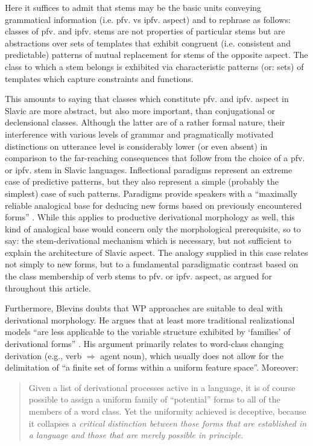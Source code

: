 \documentclass[output=paper]{langscibook}
\begin{document}
Here it suffices to admit that stems may be the basic units conveying grammatical information (i.e. pfv. vs ipfv. aspect) and to rephrase as follows: classes of pfv. and ipfv. stems are not properties of particular stems but are abstractions over sets of templates that exhibit congruent (i.e. consistent and predictable) patterns of mutual replacement for stems of the opposite aspect. The class to which a stem belongs is exhibited via characteristic patterns (or: sets) of templates which capture constraints and functions.

This amounts to saying that classes which constitute pfv. and ipfv. aspect in Slavic are more abstract, but also more important, than conjugational or declensional classes. Although the latter are of a rather formal nature, their interference with various levels of grammar and pragmatically motivated distinctions on utterance level is considerably lower (or even absent) in comparison to the far-reaching consequences that follow from the choice of a pfv. or ipfv. stem in Slavic languages. Inflectional paradigms represent an extreme case of predictive patterns, but they also represent a simple (probably the simplest) case of such patterns. Paradigms provide speakers with a “maximally reliable analogical base for deducing new forms based on previously encountered forms” \citep[12]{Blevins2016}. While this applies to productive derivational morphology as well, this kind of analogical base would concern only the morphological prerequisite, so to say: the stem-derivational mechanism which is necessary, but not sufficient to explain the architecture of Slavic aspect. The analogy supplied in this case relates not simply to new forms, but to a fundamental paradigmatic contrast based on the class membership of verb stems to pfv. or ipfv. aspect, as argued for throughout this article.

Furthermore, Blevins doubts that WP approaches are suitable to deal with derivational morphology. He argues that at least more traditional realizational models “are less applicable to the variable structure exhibited by ‘families’ of derivational forms” \citep[159]{Blevins2016}. His argument primarily relates to word-class changing derivation (e.g., verb ${\Rightarrow}$ agent noun), which usually does not allow for the delimitation of “a finite set of forms within a uniform feature space”. Moreover:


\begin{quote}
Given a list of derivational processes active in a language, it is of course possible to assign a uniform family of ``potential'' forms to all of the members of a word class. Yet the uniformity achieved is deceptive, because it collapses a \emph{critical distinction between those forms that are established in a language and those that are merely possible in principle}.
\citep[159, emphasis added]{Blevins2016}
\end{quote}
\end{document}
